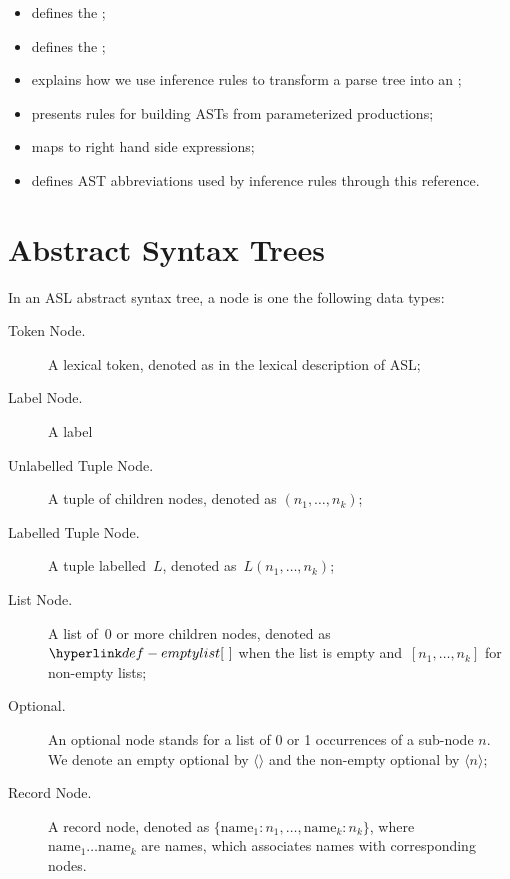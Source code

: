 \begin{itemize}
\begin{itemize}
  \end{itemize}
  \item {} defines the \untypedast;
  \item {} defines the \typedast;
  \item {} explains how we use inference rules to transform a parse tree into an \untypedast;
  \item {} presents rules for building ASTs from parameterized productions;
  \item {} maps \assignableexpressions{} to right hand side expressions;
  \item {} defines AST abbreviations used by inference rules through this reference.
\end{itemize}

\section{Abstract Syntax Trees\label{sec:AbstractSyntaxTrees}}

In an ASL abstract syntax tree, a node is one the following data types:
\begin{description}
\item[Token Node.] A lexical token, denoted as in the lexical description of ASL;
\item[Label Node.] A label
\item[Unlabelled Tuple Node.] A tuple of children nodes, denoted as $(n_1,\ldots,n_k)$;
\item[Labelled Tuple Node.] A tuple labelled~$L$, denoted as~$L(n_1,\ldots,n_k)$;
\item[List Node.] A list of~$0$ or more children nodes, denoted as~$\emptylist$
      when the list is empty and~$[n_1,\ldots,n_k]$ for non-empty lists;
\item[Optional.] An optional node stands for a list of 0 or 1 occurrences of a sub-node $n$. We denote an empty optional by $\langle\rangle$ and the non-empty optional by $\langle n \rangle$;
\item[Record Node.] A record node, denoted as $\{\text{name}_1 : n_1,\ldots,\text{name}_k : n_k\}$, where \\
      $\text{name}_1 \ldots \text{name}_k$ are names, which associates names with corresponding nodes.
\end{description}

